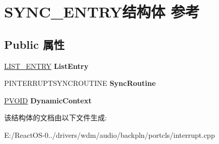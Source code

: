 \hypertarget{struct_s_y_n_c___e_n_t_r_y}{}\section{S\+Y\+N\+C\+\_\+\+E\+N\+T\+R\+Y结构体 参考}
\label{struct_s_y_n_c___e_n_t_r_y}
\subsection*{Public 属性}
\begin{DoxyCompactItemize}
\item 
\mbox{\label{struct_s_y_n_c___e_n_t_r_y_a9a740de8418d0f4b721dd6b02b79b0bf}} 
\hyperlink{struct___l_i_s_t___e_n_t_r_y}{L\+I\+S\+T\+\_\+\+E\+N\+T\+RY} {\bfseries List\+Entry}
\item 
\mbox{\label{struct_s_y_n_c___e_n_t_r_y_a02e78ec60325bb04d4231b17eeea3b44}} 
P\+I\+N\+T\+E\+R\+R\+U\+P\+T\+S\+Y\+N\+C\+R\+O\+U\+T\+I\+NE {\bfseries Sync\+Routine}
\item 
\mbox{\label{struct_s_y_n_c___e_n_t_r_y_ab9e635c4af3e258aeedbc9d1ca045986}} 
\hyperlink{interfacevoid}{P\+V\+O\+ID} {\bfseries Dynamic\+Context}
\end{DoxyCompactItemize}


该结构体的文档由以下文件生成\+:\begin{DoxyCompactItemize}
\item 
E\+:/\+React\+O\+S-\/0../drivers/wdm/audio/backpln/portcls/interrupt.\+cpp\end{DoxyCompactItemize}
